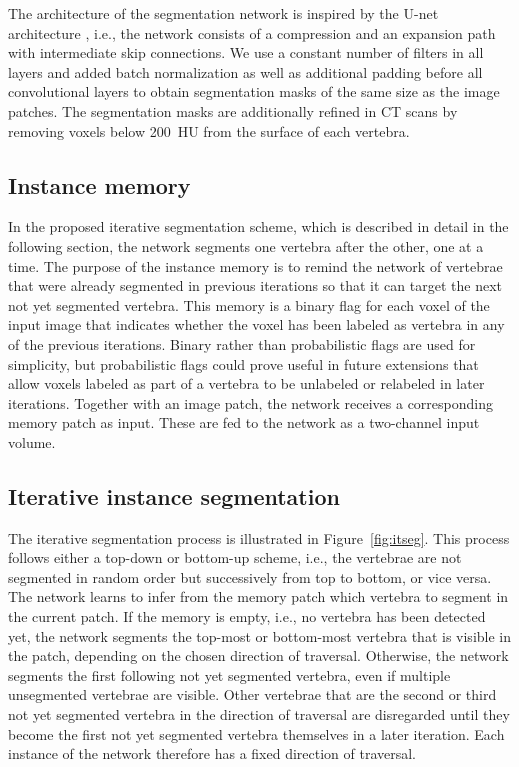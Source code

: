 \documentclass[authoryear,5p,final,times]{elsarticle}
\begin{document}
    The architecture of the segmentation network is inspired by the U-net architecture \citep{Ronneberger2015,Cicek2016}, i.e., the network consists of a compression and an expansion path with intermediate skip connections. We use a constant number of filters in all layers and added batch normalization as well as additional padding before all convolutional layers to obtain segmentation masks of the same size as the image patches. The segmentation masks are additionally refined in CT scans by removing voxels below \SI{200}{HU} from the surface of each vertebra.

    \subsection{Instance memory}
    \label{sec:method_memory}

    In the proposed iterative segmentation scheme, which is described in detail in the following section, the network segments one vertebra after the other, one at a time. The purpose of the instance memory is to remind the network of vertebrae that were already segmented in previous iterations so that it can target the next not yet segmented vertebra. This memory is a binary flag for each voxel of the input image that indicates whether the voxel has been labeled as vertebra in any of the previous iterations. Binary rather than probabilistic flags are used for simplicity, but probabilistic flags could prove useful in future extensions that allow voxels labeled as part of a vertebra to be unlabeled or relabeled in later iterations. Together with an image patch, the network receives a corresponding memory patch as input. These are fed to the network as a two-channel input volume.

    \subsection{Iterative instance segmentation}
    \label{sec:method_iterative}

    The iterative segmentation process is illustrated in Figure~\ref*{fig:itseg}. This process follows either a top-down or bottom-up scheme, i.e., the vertebrae are not segmented in random order but successively from top to bottom, or vice versa. The network learns to infer from the memory patch which vertebra to segment in the current patch. If the memory is empty, i.e., no vertebra has been detected yet, the network segments the top-most or bottom-most vertebra that is visible in the patch, depending on the chosen direction of traversal. Otherwise, the network segments the first following not yet segmented vertebra, even if multiple unsegmented vertebrae are visible. Other vertebrae that are the second or third not yet segmented vertebra in the direction of traversal are disregarded until they become the first not yet segmented vertebra themselves in a later iteration. Each instance of the network therefore has a fixed direction of traversal.
\end{document}
